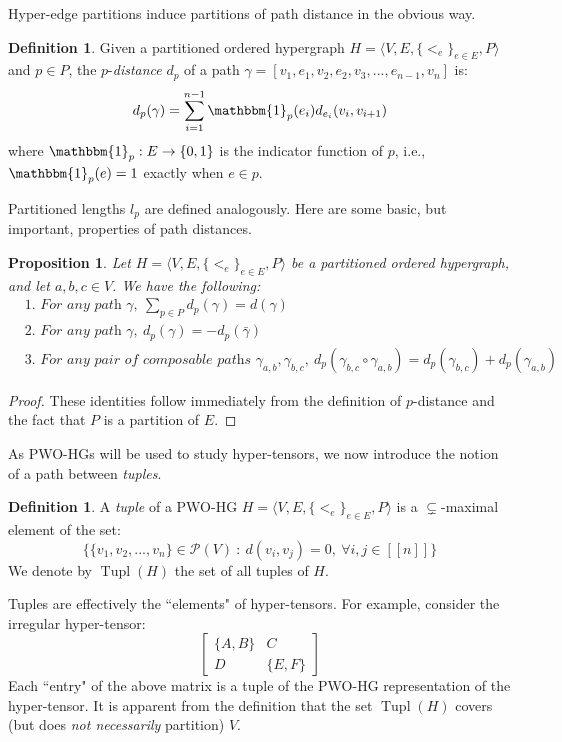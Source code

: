\documentclass{article}
\theoremstyle{plain}
\newtheorem{proposition}[theorem]{Proposition}
\theoremstyle{definition}
\newtheorem{definition}[theorem]{Definition}
\theoremstyle{remark}
\DeclareMathOperator{\tup}{Tupl}
\newcommand{\cP}{\mathcal{P}}
\begin{document}
Hyper-edge partitions induce partitions of path distance in the obvious way.
\begin{definition}
	Given a partitioned ordered hypergraph $H = \langle V, E, \{<_e\}_{e \in E}, P \rangle$ and $p \in P$, the $p$-\textit{distance} $d_p$ of a path $\gamma = [v_1, e_1, v_2, e_2, v_3, ..., e_{n-1}, v_n]$ is:
	\begin{equation*}
		d_p(\gamma) = \sum_{i = 1}^{n - 1} \mathbbm{1}_p(e_i) d_{e_i}(v_i, v_{i+1})
	\end{equation*}
	where $\mathbbm{1}_p: E \rightarrow \{0, 1\}$ is the indicator function of $p$, i.e., $\mathbbm{1}_p(e) = 1$ exactly when $e \in p$.
\end{definition}
Partitioned lengths $l_p$ are defined analogously.
\clearpage
Here are some basic, but important, properties of path distances.
\begin{proposition}
	Let $H = \langle V, E, \{<_e\}_{e \in E}, P \rangle$ be a partitioned ordered hypergraph, and let $a, b, c \in V$. We have the following:
	\begin{equation*}
		\begin{aligned}
			&\textit{1. For any path } \gamma, \ \sum_{p \in P}d_p(\gamma) = d(\gamma)\\
			&\textit{2. For any path } \gamma, \ d_p(\gamma) = -d_p(\bar{\gamma})\\
			&\textit{3. For any pair of composable paths } \gamma_{a,b}, \gamma_{b,c}, \ d_p(\gamma_{b,c} \circ \gamma_{a,b}) = d_p(\gamma_{b,c}) + d_p(\gamma_{a,b})
		\end{aligned}
	\end{equation*}
	\label{prop:DistanceProperties}
\end{proposition}
\begin{proof}
	These identities follow immediately from the definition of $p$-distance and the fact that $P$ is a partition of $E$.
\end{proof}

As PWO-HGs will be used to study hyper-tensors, we now introduce the notion of a path between \textit{tuples}.
\begin{definition}
	A \textit{tuple} of a PWO-HG $H = \langle V, E, \{<_e\}_{e \in E}, P \rangle$ is a $\subsetneq$-maximal element of the set:
	\begin{equation*}
		\big\{ \{v_1, v_2, ..., v_n\} \in \cP(V) \ : \ d(v_i, v_j) = 0, \ \forall i,j \in [[n]] \big\}
	\end{equation*}
	We denote by $\tup(H)$ the set of all tuples of $H$.
\end{definition}
Tuples are effectively the ``elements" of hyper-tensors. For example, consider the irregular hyper-tensor:
\begin{equation*}
	\begin{bmatrix}
		\{A,B\} & C\\
		D & \{E,F\}
	\end{bmatrix}
\end{equation*}
Each ``entry" of the above matrix is a tuple of the PWO-HG representation of the hyper-tensor. It is apparent from the definition that the set $\tup(H)$ covers (but does \textit{not necessarily} partition) $V$.
\end{document}
